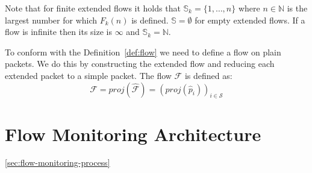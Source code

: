 
Note that for finite extended flows it holds that $\mathbb{S}_k = \{1, \ldots, n\}$ where $n \in \mathbb{N}$  is the largest number for which $F_k(n)$ is defined. $\mathbb{S} = \emptyset$ for empty extended flows. If a flow is infinite then its size is $\infty$ and $\mathbb{S}_k = \mathbb{N}$.

To conform with the Definition~\ref{def:flow} we need to define a flow on plain packets. We do this by constructing the extended flow and reducing each extended packet to a simple packet. The flow $\mathcal{F}$ is defined as:
\begin{equation}
	\mathcal{F} = proj(\widehat{\mathcal{F}}) = (proj(\widehat{p}_i))_{i \in \mathcal{S}}
\end{equation}

\section{Flow Monitoring Architecture}



\ref{sec:flow-monitoring-process}

